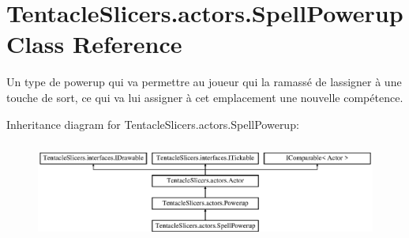 \hypertarget{class_tentacle_slicers_1_1actors_1_1_spell_powerup}{}\section{Tentacle\+Slicers.\+actors.\+Spell\+Powerup Class Reference}
\label{class_tentacle_slicers_1_1actors_1_1_spell_powerup}


Un type de powerup qui va permettre au joueur qui l\textquotesingle{}a ramassé de l\textquotesingle{}assigner à une touche de sort, ce qui va lui assigner à cet emplacement une nouvelle compétence.  


Inheritance diagram for Tentacle\+Slicers.\+actors.\+Spell\+Powerup\+:\begin{figure}[H]
\begin{center}
\leavevmode
\includegraphics[height=3.274854cm]{class_tentacle_slicers_1_1actors_1_1_spell_powerup}
\end{center}
\end{figure}

